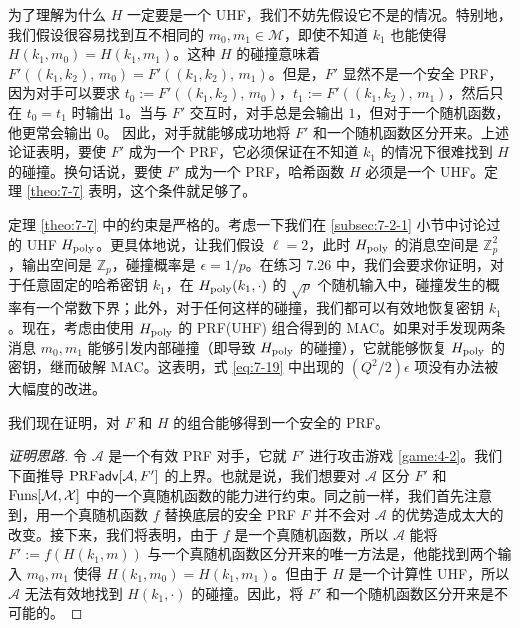 为了理解为什么 $H$ 一定要是一个 UHF，我们不妨先假设它不是的情况。特别地，我们假设很容易找到互不相同的 $m_0,m_1\in\mathcal{M}$，即使不知道 $k_1$ 也能使得 $H(k_1,m_0)=H(k_1,m_1)$。这种 $H$ 的碰撞意味着$F'((k_1,k_2),\,m_0)=F'((k_1,k_2),\,m_1)$。但是，$F'$ 显然不是一个安全 PRF，因为对手可以要求 $t_0:=F'((k_1,k_2),\,m_0)$，$t_1:=F'((k_1,k_2),\,m_1)$，然后只在 $t_0=t_1$ 时输出 $1$。当与 $F'$ 交互时，对手总是会输出 $1$，但对于一个随机函数，他更常会输出 $0$。 因此，对手就能够成功地将 $F'$ 和一个随机函数区分开来。上述论证表明，要使 $F'$ 成为一个 PRF，它必须保证在不知道 $k_1$ 的情况下很难找到 $H$ 的碰撞。换句话说，要使 $F'$ 成为一个 PRF，哈希函数 $H$ 必须是一个 UHF。定理 \ref{theo:7-7} 表明，这个条件就足够了。

\begin{remark}\label{remark:7-2}
定理 \ref{theo:7-7} 中的约束是严格的。考虑一下我们在 \ref{subsec:7-2-1} 小节中讨论过的 UHF $H_{\rm poly}$。更具体地说，让我们假设 $\ell=2$，此时 $H_{\rm poly}$ 的消息空间是 $\mathbb{Z}^2_p$，输出空间是 $\mathbb{Z}_p$，碰撞概率是 $\epsilon={1}/{p}$。在练习 7.26 中，我们会要求你证明，对于任意固定的哈希密钥 $k_1$，在 $H_{\rm poly}(k_1,\cdot)$ 的 $\sqrt{p}$ 个随机输入中，碰撞发生的概率有一个常数下界；此外，对于任何这样的碰撞，我们都可以有效地恢复密钥 $k_1$。现在，考虑由使用 $H_{\rm poly}$ 的 PRF(UHF) 组合得到的 MAC。如果对手发现两条消息 $m_0,m_1$ 能够引发内部碰撞（即导致 $H_{\rm poly}$ 的碰撞），它就能够恢复 $H_{\rm poly}$ 的密钥，继而破解 MAC。这表明，式 \ref{eq:7-19} 中出现的 ${(Q^2/2)\epsilon}$ 项没有办法被大幅度的改进。
\end{remark}

\begin{snote}
我们现在证明，对 $F$ 和 $H$ 的组合能够得到一个安全的 PRF。
\end{snote}

\begin{proof}[证明思路]
令 $\mathcal{A}$ 是一个有效 PRF 对手，它就 $F'$ 进行攻击游戏 \ref{game:4-2}。我们下面推导 ${\rm PRF}\mathsf{adv}[\mathcal{A},F']$ 的上界。也就是说，我们想要对 $\mathcal{A}$ 区分 $F'$ 和 ${\rm Funs}[\mathcal{M},\mathcal{X}]$ 中的一个真随机函数的能力进行约束。同之前一样，我们首先注意到，用一个真随机函数 $f$ 替换底层的安全 PRF $F$ 并不会对 $\mathcal{A}$ 的优势造成太大的改变。接下来，我们将表明，由于 $f$ 是一个真随机函数，所以 $\mathcal{A}$ 能将 $F':=f(H(k_1,m))$ 与一个真随机函数区分开来的唯一方法是，他能找到两个输入 $m_0,m_1$ 使得 $H(k_1,m_0)=H(k_1,m_1)$。但由于 $H$ 是一个计算性 UHF，所以 $\mathcal{A}$ 无法有效地找到 $H(k_1,\cdot)$ 的碰撞。因此，将 $F'$ 和一个随机函数区分开来是不可能的。
\end{proof}

